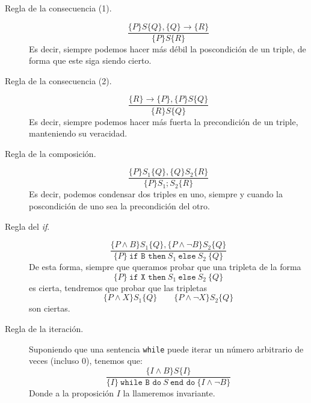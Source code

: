 \begin{description}
    \item [Regla de la consecuencia (1).] 
        \begin{equation*}
            \dfrac{\{P\}S\{Q\}, \{Q\}\rightarrow\{R\}}{\{P\}S\{R\}}
        \end{equation*}
        Es decir, siempre podemos hacer más débil la poscondición de un triple, de forma que este siga siendo cierto.
    \item [Regla de la consecuencia (2).] 
        \begin{equation*}
            \dfrac{\{R\}\rightarrow\{P\},\{P\}S\{Q\}}{\{R\}S\{Q\}}
        \end{equation*}
        Es decir, siempre podemos hacer más fuerta la precondición de un triple, manteniendo su veracidad.
    \item [Regla de la composición.] 
        \begin{equation*}
            \dfrac{\{P\}S_1\{Q\}, \{Q\}S_2\{R\}}{\{P\}S_1;S_2\{R\}}
        \end{equation*}
        Es decir, podemos condensar dos triples en uno, siempre y cuando la poscondición de uno sea la precondición del otro.
    \item [Regla del \textit{if}.] 
        \begin{equation*}
            \dfrac{\{P\land B\}S_1\{Q\}, \{P\land \lnot B\}S_2\{Q\}}{\{P\}\ \texttt{if B then}\ S_1\ \texttt{else}\ S_2\ \{Q\}}
        \end{equation*}
        De esta forma, siempre que queramos probar que una tripleta de la forma
        \begin{equation*}
            \{P\}\ \texttt{if X then}\ S_1\ \texttt{else}\ S_2\ \{Q\}
        \end{equation*}
        es cierta, tendremos que probar que las tripletas
        \begin{equation*}
            \{P\land X\}S_1\{Q\}\qquad \{P\land \lnot X\}S_2\{Q\}
        \end{equation*}
        son ciertas.
    \item [Regla de la iteración.] 
        Suponiendo que una sentencia \verb|while| puede iterar un número arbitrario de veces (incluso 0), tenemos que:
        \begin{equation*}
            \dfrac{\{I\land B\}S\{I\}}{\{I\}\ \texttt{while B do}\ S\ \texttt{end do}\ \{I\land \lnot B\}}
        \end{equation*}
        Donde a la proposición $I$ la llameremos invariante.
\end{description}

